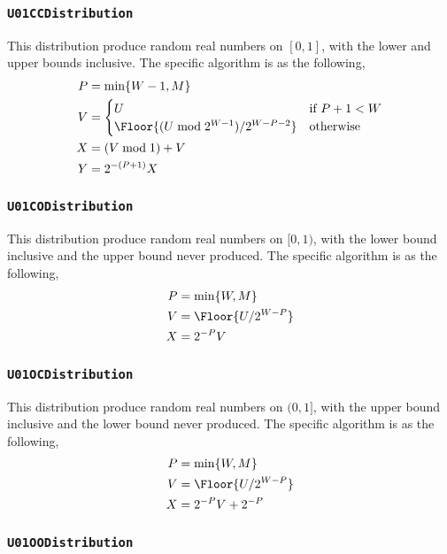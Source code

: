 \subsubsection{\texttt{U01CCDistribution}}

This distribution produce random real numbers on $[0, 1]$, with the lower and
upper bounds inclusive. The specific algorithm is as the following,
\begin{align*}
  P &= \min\{W - 1, M\} \\
  V &= \begin{cases}
    U &\text{if } P + 1 < W \\
    \Floor{(U \bmod 2^{W - 1}) / 2^{W - P -2}} &\text{otherwise}
  \end{cases} \\
  X &= (V \bmod 1) + V \\
  Y &= 2^{-(P + 1)} X
\end{align*}

\subsubsection{\texttt{U01CODistribution}}

This distribution produce random real numbers on $[0, 1)$, with the lower bound
inclusive and the upper bound never produced. The specific algorithm is as the
following,
\begin{align*}
  P &= \min\{W, M\} \\
  V &= \Floor{U / 2^{W - P}} \\
  X &= 2^{-P} V
\end{align*}

\subsubsection{\texttt{U01OCDistribution}}

This distribution produce random real numbers on $(0, 1]$, with the upper bound
inclusive and the lower bound never produced. The specific algorithm is as the
following,
\begin{align*}
  P &= \min\{W, M\} \\
  V &= \Floor{U / 2^{W - P}} \\
  X &= 2^{-P} V + 2^{-P}
\end{align*}

\subsubsection{\texttt{U01OODistribution}}

